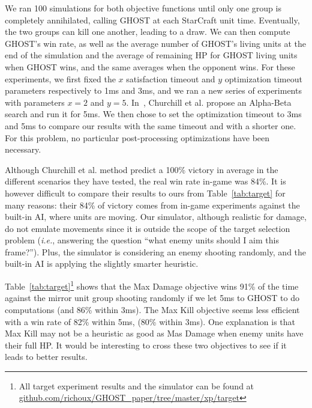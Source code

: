 \documentclass[journal]{IEEEtran}
\newcommand{\ghost}{\textsc{GHOST}\xspace}
\newcommand{\ie}{\textit{i.e.}}
\begin{document}
We ran  100 simulations  for both objective  functions until  only one
group is completely annihilated, calling \ghost at each StarCraft unit
time. Eventually,  the two groups can  kill one another, leading  to a
draw. We  can then compute \ghost's  win rate, as well  as the average
number of \ghost's  living units at the end of  the simulation and the
average of remaining HP for \ghost  living units when \ghost wins, and
the same  averages when the  opponent wins. For these  experiments, we
first fixed the $x$ satisfaction  timeout and $y$ optimization timeout
parameters respectively  to 1ms and  3ms, and we  ran a new  series of
experiments with parameters  $x=2$ and $y=5$.  In~\cite{ChurchillSB12,
  ChurchillB12}, Churchill et al. propose an Alpha-Beta search and run
it for 5ms.  We then chose to  set the optimization timeout to 3ms and
5ms to  compare our results with  the same timeout and  with a shorter
one.  For this  problem, no  particular post-processing  optimizations
have been necessary.

Although Churchill et al. method predict a 100\% victory in average in
the different  scenarios they have  tested, the real win  rate in-game
was 84\%.   It is however difficult  to compare their results  to ours
from Table~\ref{tab:target}  for many  reasons: their 84\%  of victory
comes from  in-game experiments against  the built-in AI,  where units
are  moving. Our  simulator,  although realistic  for  damage, do  not
emulate  movements  since  it  is  outside the  scope  of  the  target
selection  problem (\ie,  answering  the question  ``what enemy  units
should I  aim this  frame?''). Plus, the  simulator is  considering an
enemy shooting randomly, and the  built-in AI is applying the slightly
smarter heuristic.

Table~\ref{tab:target}\footnote{All target experiment  results and the
  simulator            can            be           found            at
  \href{https://github.com/richoux/GHOST\_paper/tree/master/xp/target}{github.com/richoux/GHOST\_paper/tree/master/xp/target}}
shows that the Max Damage objective  wins 91\% of the time against the
mirror unit  group shooting  randomly if  we let 5ms  to \ghost  to do
computations (and 86\% within 3ms).  The Max Kill objective seems less
efficient with a  win rate of 82\% within 5ms,  (80\% within 3ms). One
explanation is  that Max Kill  may not be a  heuristic as good  as Mas
Damage when enemy  units have their full HP.  It  would be interesting
to cross these two objectives to see if it leads to better results.
\end{document}

